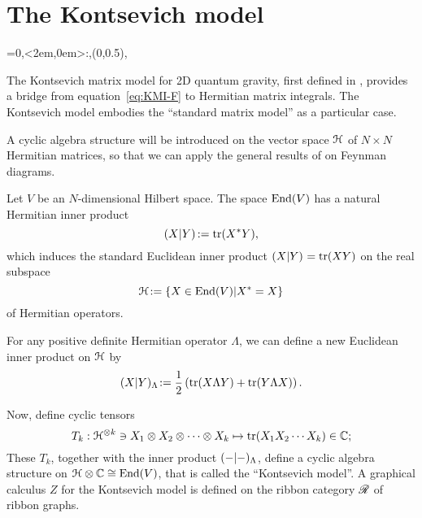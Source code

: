 \section{The Kontsevich model}
\label{sec:matrix-models}
\everyxy={0,<2em,0em>:,(0,0.5),} %

The Kontsevich matrix model for 2D quantum gravity, first defined in
\cite{kontsevich;intersection-theory;1992}, provides a bridge from
equation~\eqref{eq:KMI-F} to Hermitian matrix integrals. The
Kontsevich model embodies the ``standard matrix model'' as a
particular case.

A cyclic algebra structure will be introduced on the vector space
$\Hermitian[N]$ of $N\times N$ Hermitian matrices, so that we can apply the
general results of  on Feynman diagrams.

Let $V$ be an $N$-dimensional Hilbert space. The space $\End(V)$
has a natural Hermitian inner product
\begin{equation*} 
  \inner{X}{Y}\joinrel:=\tr(X^*Y),
\end{equation*}
which induces the standard Euclidean inner product $\inner{X}{Y} =
\tr(XY)$ on the real subspace
\begin{equation*}
  \Hermitian[N]\joinrel:=\{X\in \End(V) | X^*=X\}
\end{equation*}
of Hermitian operators.  

For any positive definite Hermitian operator $\Lambda$, we can define
a new Euclidean inner product on $\Hermitian[N]$ by
\begin{equation*}
  \inner[\Lambda]{X}{Y} \joinrel:= 
  \onehalf \left(\tr(X\Lambda Y) + \tr(Y\Lambda X)\right).
\end{equation*}

Now, define cyclic tensors
\begin{equation*}
  T_k:\Hermitian[N]\tp{k} \ni X_1 \otimes X_2 \otimes \dots \otimes X_k 
  \mapsto 
  \tr(X_1X_2\cdots X_k) \in \setC;
\end{equation*}
These $T_k$, together with the inner product $\inner[\Lambda]{-}{-}$, define
a cyclic algebra structure on $\Hermitian[N] \otimes \setC \cong \End(V)$, that is
called the ``Kontsevich model''.  A graphical calculus $Z$ for the
Kontsevich model is defined on the ribbon category $\RG$ of ribbon
graphs.

